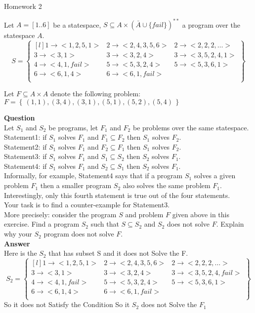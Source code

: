 \documentclass[12pt]{article}
\begin{document}
\author{Lizhipeng}

\begin{center}
{\Large Homework 2}
\end{center}
\bigskip

Let $A=\left[1..6\right]$ be a statespace, $S\subseteq A \times (\bar{A}\cup\{fail\})^{**}$ a program over the statespace $A$.
\[
S = \begin{Bmatrix*}[l]
1\rightarrow<1,2,5,1> & 2\rightarrow<2,4,3,5,6> & 2\rightarrow<2,2,2,\ldots>\\
3\rightarrow<3,1> & 3\rightarrow<3,2,4> & 3\rightarrow<3,5,2,4,1>\\
4\rightarrow<4,1,fail> & 5\rightarrow<5,3,2,4> & 5\rightarrow<5,3,6,1>\\
6\rightarrow<6,1,4> & 6\rightarrow<6,1,fail> & \\
\end{Bmatrix*}
\]

Let $F\subseteq A \times A$ denote the following problem: $F=\left\{\,(1,1),(3,4),(3,1),(5,1),(5,2),(5,4)\,\right\}$\\
\bigskip

\textbf{Question}\\ 
Let $S_1$ and $S_2$ be programs, let $F_1$ and $F_2$ be problems over the same statespace.\\
Statement1: if $S_1$ solves $F_1$ and $F_1 \subseteq F_2$ then $S_1$ solves $F_2$.\\
Statement2: if $S_1$ solves $F_1$ and $F_2 \subseteq F_1$ then $S_1$ solves $F_2$.\\
Statement3: if $S_1$ solves $F_1$ and $S_1 \subseteq S_2$ then $S_2$ solves $F_1$.\\
Statement4: if $S_1$ solves $F_1$ and $S_2 \subseteq S_1$ then $S_2$ solves $F_1$.\\

Informally, for example, Statement4 says that if a program $S_1$ solves a given problem $F_1$ then a smaller program $S_2$ also solves the same problem $F_1$. Interestingly, only this fourth statement is true out of the four statements.\\

Your task is to find a counter-example for Statement3.\\
More precisely: consider the program $S$ and problem $F$ given above in this exercise. Find a program $S_2$ such that $S \subseteq S_2$ and $S_2$ does not solve $F$. Explain why your $S_2$ program does not solve $F$.\\
\textbf{Answer}\\
Here is the $S_2$ that has subset S and it does not Solve the F.
\[
S_2 = \begin{Bmatrix*}[l]
1\rightarrow<1,2,5,1> & 2\rightarrow<2,4,3,5,6> & 2\rightarrow<2,2,2,\ldots>\\
3\rightarrow<3,1> & 3\rightarrow<3,2,4> & 3\rightarrow<3,5,2,4,fail>\\
4\rightarrow<4,1,fail> & 5\rightarrow<5,3,2,4> & 5\rightarrow<5,3,6,1>\\
6\rightarrow<6,1,4> & 6\rightarrow<6,1,fail> & \\
\end{Bmatrix*}
\]
So it does not Satisfy the Condition So it $S_2$ does not Solve the $F_1$
\end{document}
